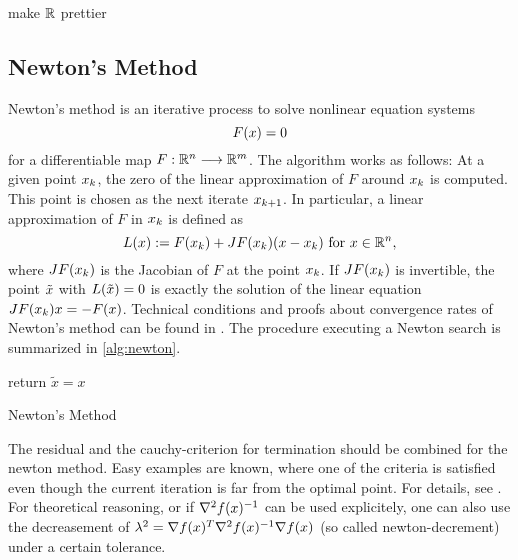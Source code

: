 
\todo make $ \mathbb{R} $ prettier\\

\subsection{Newton's Method}
Newton's method is an iterative process to solve nonlinear equation systems
\begin{equation}
F(x)= 0
\end{equation}
for a differentiable map $ F: \mathbb{R}^n \longrightarrow \mathbb{R}^m $. The algorithm works as follows: At a given point $ x_k $, the zero of the linear approximation of $ F $ around $ x_k $  is computed. This point is chosen as the next iterate $ x_{k+1} $. In particular, a linear approximation of $ F $ in  $ x_k $ is defined as
\begin{equation}
L(x):= F(x_k) + J F (x_k)(x - x_k) \text{ for } x\in \mathbb{R}^n,
\end{equation}
where $ J F (x_k) $ is the Jacobian of $ F $ at the point $ x_k $. If $ J F (x_k) $ is invertible, the point $ \tilde{x} $ with $ L(\tilde{x})=0 $ is exactly the solution of  the linear equation $ J F (x_k) x = -F(x) $.
Technical conditions and proofs about convergence rates of Newton's method can be found in \cite{SO}.
The procedure executing a Newton search is summarized in \eqref{alg:newton}.

\begin{algorithm}
	\SetAlgoLined
	\BlankLine
	return $ \tilde{x} = x $\;
	\caption{Newton's Method}
	\label{alg:newton}
\end{algorithm}
\begin{remark}\label{re:newtonStop}
	The residual and the cauchy-criterion for termination should be combined for the newton method. Easy examples are known, where one of the criteria is satisfied even though the current iteration is far from the optimal point. For details, see \cite{SO}.
	For theoretical reasoning, or if $ \nabla^2 f(x)^{-1} $ can be used explicitely, one can also use the decreasement of $ \lambda^2 = \nabla f(x) ^T \nabla^2 f(x)^{-1} \nabla f(x)$ (so called newton-decrement) under a certain tolerance.
\end{remark}

